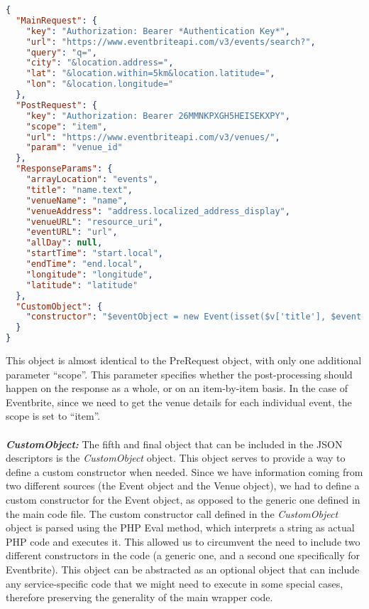\begin{lstlisting}[language=json,firstnumber=1]
{
  "MainRequest": {
    "key": "Authorization: Bearer *Authentication Key*",
    "url": "https://www.eventbriteapi.com/v3/events/search?",
    "query": "q=",
    "city": "&location.address=",
    "lat": "&location.within=5km&location.latitude=",
    "lon": "&location.longitude="
  },
  "PostRequest": {
    "key": "Authorization: Bearer 26MMNKPXGH5HEISEKXPY",
    "scope": "item",
    "url": "https://www.eventbriteapi.com/v3/venues/",
    "param": "venue_id"
  },
  "ResponseParams": {
    "arrayLocation": "events",
    "title": "name.text",
    "venueName": "name",
    "venueAddress": "address.localized_address_display",
    "venueURL": "resource_uri",
    "eventURL": "url",
    "allDay": null,
    "startTime": "start.local",
    "endTime": "end.local",
    "longitude": "longitude",
    "latitude": "latitude"
  },
  "CustomObject": {
    "constructor": "$eventObject = new Event(isset($v['title'], $event[$v['title']]) ? $event[$v['title']] : '', isset($v['venueName'], $postObject[$v['venueName']]) ? $postObject[$v['venueName']] : '', isset($v['venueAddress'], $postObject[$v['venueAddress']]) ? $postObject[$v['venueAddress']] : '', isset($v['venueURL'], $postObject[$v['venueURL']]) ? $postObject[$v['venueURL']] : '', isset($v['eventURL'], $event[$v['eventURL']]) ? $event[$v['eventURL']] : '', isset($v['allDay'], $event[$v['allDay']]) ? $event[$v['allDay']] : '', isset($v['startTime'], $event[$v['startTime']]) ? $event[$v['startTime']] : '', isset($v['endTime'], $event[$v['endTime']]) ? $event[$v['endTime']] : '', isset($v['latitude'], $postObject[$v['latitude']]) ? $postObject[$v['latitude']] : '', isset($v['longitude'], $postObject[$v['longitude']]) ? $postObject[$v['longitude']] : '');"
  }
}
\end{lstlisting}
This object is almost identical to the PreRequest object, with only one additional parameter ``scope''. This parameter specifies whether the post-processing should happen on the response as a whole, or on an item-by-item basis. In the case of Eventbrite, since we need to get the venue details for each individual event, the scope is set to ``item''.\\\\
\textbf{\textit{CustomObject:}} The fifth and final object that can be included in the JSON descriptors is the \emph{CustomObject} object. This object serves to provide a way to define a custom constructor when needed. Since we have information coming from two different sources (the Event object and the Venue object), we had to define a custom constructor for the Event object, as opposed to the generic one defined in the main code file. The custom constructor call defined in the \emph{CustomObject} object is parsed using the PHP Eval method, which interprets a string as actual PHP code and executes it. This allowed us to circumvent the need to include two different constructors in the code (a generic one, and a second one specifically for Eventbrite). This object can be abstracted as an optional object that can include any service-specific code that we might need to execute in some special cases, therefore preserving the generality of the main wrapper code.
\newpage
